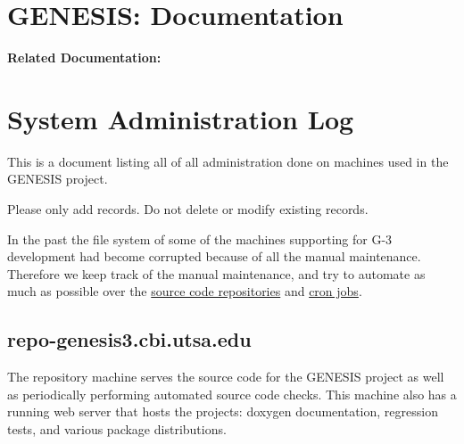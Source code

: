 \documentclass[12pt]{article}
\begin{document}
\section*{GENESIS: Documentation}

{\bf Related Documentation:}

\section*{System Administration Log}

This is a document listing all of all administration done on machines
used in the GENESIS project.

Please only add records.  Do not delete or modify existing records.

In the past the file system of some of the machines supporting for G-3
development had become corrupted because of all the manual
maintenance.  Therefore we keep track of the manual maintenance, and
try to automate as much as possible over the
\href{../version-control/version-control.tex}{source code
  repositories} and
\href{../neurospaces-cron/neurospaces-cron.tex}{cron jobs}.

\subsection*{repo-genesis3.cbi.utsa.edu}

The repository machine serves the source code for the GENESIS project as well as periodically performing automated source code checks. This machine also has a running web server that hosts the projects: doxygen documentation, regression tests, and various package distributions.
\end{document}
